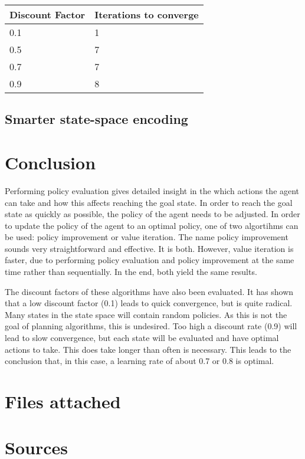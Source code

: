 \documentclass{article}
\begin{document}
\begin{center}
	\begin{tabular}{ l || l }
		Discount Factor & Iterations to converge \\ 
		\hline
		0.1 & 1 \\
		0.5 & 7 \\
		0.7 & 7 \\
		0.9 & 8 \\	
	\end{tabular}
\end{center}

\subsection*{Smarter state-space encoding}


\section*{Conclusion}
Performing policy evaluation gives detailed insight in the which actions the agent can take and how this affects reaching the goal state. In order to reach the goal state as quickly as possible, the policy of the agent needs to be adjusted. In order to update the policy of the agent to an optimal policy, one of two algortihms can be used: policy improvement or value iteration. The name policy improvement sounds very straightforward and effective. It is both. However, value iteration is faster, due to performing policy evaluation and policy improvement at the same time rather than sequentially. In the end, both yield the same results.

The discount factors of these algorithms have also been evaluated. It has shown that a low discount factor (0.1) leads to quick convergence, but is quite radical. Many states in the state space will contain random policies. As this is not the goal of planning algorithms, this is undesired. Too high a discount rate (0.9) will lead to slow convergence, but each state will be evaluated and have optimal actions to take. This does take longer than often is necessary. This leads to the conclusion that, in this case, a learning rate of about 0.7 or 0.8 is optimal.

\section*{Files attached}

\section*{Sources}


\begin{comment}
\begin{itemize}
	\item [1] Barto and Sutton (http://webdocs.cs.ualberta.ca/~sutton/book/the-book.html)
\end{itemize}
\end{comment}
\end{document}
